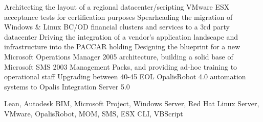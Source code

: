 \begin{experiences}
{\begin{itemize}
                        \linebreak Architecting the layout of a regional datacenter/scripting VMware ESX acceptance tests for certification purposes
                        \linebreak Spearheading the migration of Windows \& Linux BC/OD financial clusters and services to a 3rd party datacenter
                        \linebreak Driving the integration of a vendor's application landscape and infrastructure into the PACCAR holding
                        \linebreak Designing the blueprint for a new Microsoft Operations Manager 2005 architecture, building a solid base of Microsoft SMS 2003 Management Packs, and providing ad-hoc training to operational staff
                        \linebreak Upgrading between 40-45 EOL OpalisRobot 4.0 automation systems to Opalis Integration Server 5.0
                      \end{itemize}
                    }
                    {Lean, Autodesk BIM, Microsoft Project, Windows Server, Red Hat Linux Server, VMware, OpalisRobot, MOM, SMS, ESX CLI, VBScript}
\end{experiences}
